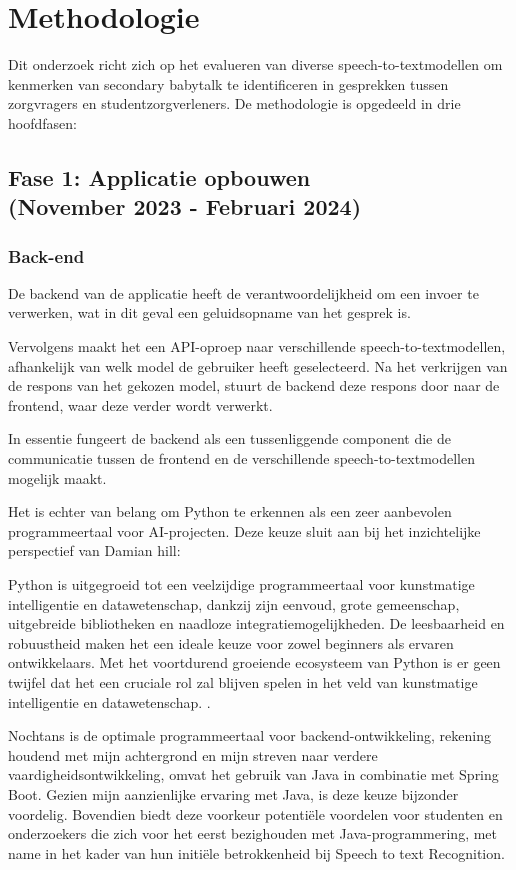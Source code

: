 \section{Methodologie}%
\label{sec:methodologie}
Dit onderzoek richt zich op het evalueren van diverse speech-to-textmodellen om kenmerken van secondary babytalk te identificeren in gesprekken tussen zorgvragers en studentzorgverleners. De methodologie is opgedeeld in drie hoofdfasen:
\subsection{Fase 1: Applicatie opbouwen \\ (November 2023 - Februari 2024)}
\subsubsection{Back-end}
De backend van de applicatie heeft de verantwoordelijkheid om een invoer te verwerken, wat in dit geval een geluidsopname van het gesprek is.

Vervolgens maakt het een API-oproep naar verschillende speech-to-textmodellen, afhankelijk van welk model de gebruiker heeft geselecteerd. Na het verkrijgen van de respons van het gekozen model, stuurt de backend deze respons door naar de frontend, waar deze verder wordt verwerkt.

In essentie fungeert de backend als een tussenliggende component die de communicatie tussen de frontend en de verschillende speech-to-textmodellen mogelijk maakt.

Het is echter van belang om Python te erkennen als een zeer aanbevolen programmeertaal voor AI-projecten. Deze keuze sluit aan bij het inzichtelijke perspectief van Damian hill:

Python is uitgegroeid tot een veelzijdige programmeertaal voor kunstmatige intelligentie en datawetenschap, dankzij zijn eenvoud, grote gemeenschap, uitgebreide bibliotheken en naadloze integratiemogelijkheden. De leesbaarheid en robuustheid maken het een ideale keuze voor zowel beginners als ervaren ontwikkelaars. Met het voortdurend groeiende ecosysteem van Python is er geen twijfel dat het een cruciale rol zal blijven spelen in het veld van kunstmatige intelligentie en datawetenschap. \autocite{Hill2023}.

Nochtans is de optimale programmeertaal voor backend-ontwikkeling, rekening houdend met mijn achtergrond en mijn streven naar verdere vaardigheidsontwikkeling, omvat het gebruik van Java in combinatie met Spring Boot. Gezien mijn aanzienlijke ervaring met Java, is deze keuze bijzonder voordelig. Bovendien biedt deze voorkeur potentiële voordelen voor studenten en onderzoekers die zich voor het eerst bezighouden met Java-programmering, met name in het kader van hun initiële betrokkenheid bij Speech to text Recognition.

